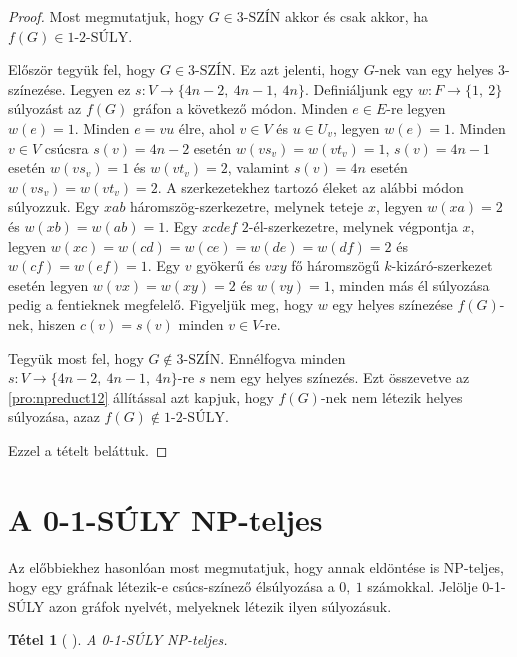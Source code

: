 \documentclass[12pt, a4paper]{report}
\newtheorem{tét}{Tétel}[section]
\theoremstyle{remark}
\theoremstyle{definition}
\begin{document}
\begin{proof}
Most megmutatjuk, hogy $G \in \textrm{3-SZÍN}$ akkor és csak akkor, ha $f(G) \in \textrm{1-2-SÚLY}$.

Először tegyük fel, hogy $G \in \textrm{3-SZÍN}$. Ez azt jelenti, hogy $G$-nek van egy helyes $3$-színezése. Legyen ez $s: V \rightarrow \lbrace 4n - 2,\ 4n - 1,\ 4n \rbrace$. Definiáljunk egy $w: F \rightarrow \lbrace 1,\ 2 \rbrace$ súlyozást az $f(G)$ gráfon a következő módon. Minden $e \in E$-re legyen $w(e) = 1$. Minden $e = vu$ élre, ahol $v \in V$ és $u \in U_v$, legyen $w(e) = 1$. Minden $v \in V$ csúcsra $s(v) = 4n - 2$ esetén $w(vs_v) = w(vt_v) = 1$, $s(v) = 4n - 1$ esetén $w(vs_v) = 1$ és $w(vt_v) = 2$, valamint $s(v) = 4n$ esetén $w(vs_v) = w(vt_v) = 2$. A szerkezetekhez tartozó éleket az alábbi módon súlyozzuk. Egy $xab$ háromszög-szerkezetre, melynek teteje $x$, legyen $w(xa) = 2$ és $w(xb) = w(ab) = 1$. Egy $xcdef$ $2$-él-szerkezetre, melynek végpontja $x$, legyen $w(xc) = w(cd) = w(ce) = w(de) = w(df) = 2$ és $w(cf) = w(ef) = 1$. Egy $v$ gyökerű és $vxy$ fő háromszögű $k$-kizáró-szerkezet esetén legyen $w(vx) = w(xy) = 2$ és $w(vy) = 1$, minden más él súlyozása pedig a fentieknek megfelelő. Figyeljük meg, hogy $w$ egy helyes színezése $f(G)$-nek, hiszen $c(v) = s(v)$ minden $v \in V$-re.

Tegyük most fel, hogy $G \notin \textrm{3-SZÍN}$. Ennélfogva minden $s: V \rightarrow \lbrace 4n - 2,\ 4n - 1,\ 4n \rbrace$-re $s$ nem egy helyes színezés. Ezt összevetve az \ref{pro:npreduct12} állítással azt kapjuk, hogy $f(G)$-nek nem létezik helyes súlyozása, azaz $f(G) \notin \textrm{1-2-SÚLY}$.

Ezzel a tételt beláttuk.
\end{proof}

\section{A 0-1-SÚLY NP-teljes}
Az előbbiekhez hasonlóan most megmutatjuk, hogy annak eldöntése is NP-teljes, hogy egy gráfnak létezik-e csúcs-színező élsúlyozása a $0,\ 1$ számokkal. Jelölje 0-1-SÚLY azon gráfok nyelvét, melyeknek létezik ilyen súlyozásuk.

\begin{tét}[\citeauthor{Dudek2011} \cite{Dudek2011}]
A 0-1-SÚLY NP-teljes.
\end{tét}
\end{document}
